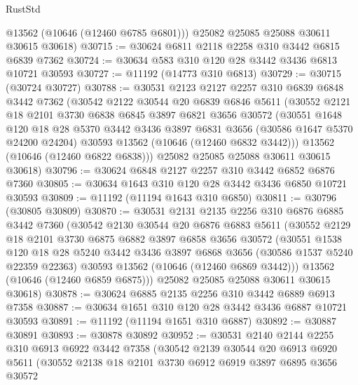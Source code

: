 \begin{lexlean}{RustStd}
\begin{coremodule}
        @13562
        (@10646 (@12460 @6785 @6801)))
      @25082
      @25085
      @25088
      @30611
      @30615
      @30618)
@30715 := @30624 @6811 @2118 @2258 @310 @3442 @6815 @6839 @7362
@30724 := @30634 @583 @310 @120 @28 @3442 @3436 @6813 @10721 @30593
@30727 := @11192 (@14773 @310 @6813)
@30729 := @30715 (@30724 @30727)
@30788 := @30531
    @2123
    @2127
    @2257
    @310
    @6839
    @6848
    @3442
    @7362
    (@30542
      @2122
      @30544
      @20
      @6839
      @6846
      @5611
      (@30552
        @2121
        @18
        @2101
        @3730
        @6838
        @6845
        @3897
        @6821
        @3656
        @30572
        (@30551
          @1648
          @120
          @18
          @28
          @5370
          @3442
          @3436
          @3897
          @6831
          @3656
          (@30586 @1647 @5370 @24200 @24204)
          @30593
          @13562
          (@10646 (@12460 @6832 @3442)))
        @13562
        (@10646 (@12460 @6822 @6838)))
      @25082
      @25085
      @25088
      @30611
      @30615
      @30618)
@30796 := @30624 @6848 @2127 @2257 @310 @3442 @6852 @6876 @7360
@30805 := @30634 @1643 @310 @120 @28 @3442 @3436 @6850 @10721 @30593
@30809 := @11192 (@11194 @1643 @310 @6850)
@30811 := @30796 (@30805 @30809)
@30870 := @30531
    @2131
    @2135
    @2256
    @310
    @6876
    @6885
    @3442
    @7360
    (@30542
      @2130
      @30544
      @20
      @6876
      @6883
      @5611
      (@30552
        @2129
        @18
        @2101
        @3730
        @6875
        @6882
        @3897
        @6858
        @3656
        @30572
        (@30551
          @1538
          @120
          @18
          @28
          @5240
          @3442
          @3436
          @3897
          @6868
          @3656
          (@30586 @1537 @5240 @22359 @22363)
          @30593
          @13562
          (@10646 (@12460 @6869 @3442)))
        @13562
        (@10646 (@12460 @6859 @6875)))
      @25082
      @25085
      @25088
      @30611
      @30615
      @30618)
@30878 := @30624 @6885 @2135 @2256 @310 @3442 @6889 @6913 @7358
@30887 := @30634 @1651 @310 @120 @28 @3442 @3436 @6887 @10721 @30593
@30891 := @11192 (@11194 @1651 @310 @6887)
@30892 := @30887 @30891
@30893 := @30878 @30892
@30952 := @30531
    @2140
    @2144
    @2255
    @310
    @6913
    @6922
    @3442
    @7358
    (@30542
      @2139
      @30544
      @20
      @6913
      @6920
      @5611
      (@30552
        @2138
        @18
        @2101
        @3730
        @6912
        @6919
        @3897
        @6895
        @3656
        @30572

\end{coremodule}
\end{lexlean}
